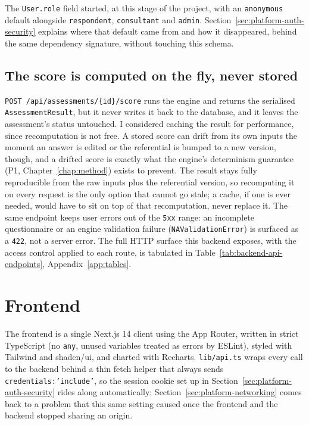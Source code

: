The \texttt{User.\allowbreak role} field started, at this stage of the project, with an \texttt{anonymous} default alongside \texttt{respondent}, \texttt{consultant} and \texttt{admin}. Section~\ref{sec:platform-auth-security} explains where that default came from and how it disappeared, behind the same dependency signature, without touching this schema.

\subsection{The score is computed on the fly, never stored}

\texttt{POST /\allowbreak api/\allowbreak assessments/\allowbreak \{id\}/\allowbreak score} runs the engine and returns the serialised \texttt{Assessment\allowbreak Result}, but it never writes it back to the database, and it leaves the assessment's status untouched. I considered caching the result for performance, since recomputation is not free. A stored score can drift from its own inputs the moment an answer is edited or the referential is bumped to a new version, though, and a drifted score is exactly what the engine's determinism guarantee (P1, Chapter~\ref{chap:method}) exists to prevent. The result stays fully reproducible from the raw inputs plus the referential version, so recomputing it on every request is the only option that cannot go stale; a cache, if one is ever needed, would have to sit on top of that recomputation, never replace it. The same endpoint keeps user errors out of the \texttt{5xx} range: an incomplete questionnaire or an engine validation failure (\texttt{NAValidation\allowbreak Error}) is surfaced as a \texttt{422}, not a server error. The full HTTP surface this backend exposes, with the access control applied to each route, is tabulated in Table~\ref{tab:backend-api-endpoints}, Appendix~\ref{app:tables}.

\section{Frontend}
\label{sec:platform-frontend}

The frontend is a single Next.js 14 client using the App Router, written in strict TypeScript (no \texttt{any}, unused variables treated as errors by ESLint), styled with Tailwind and shadcn/ui, and charted with Recharts. \texttt{lib/\allowbreak api.\allowbreak ts} wraps every call to the backend behind a thin fetch helper that always sends \texttt{credentials:\allowbreak 'include'}, so the session cookie set up in Section~\ref{sec:platform-auth-security} rides along automatically; Section~\ref{sec:platform-networking} comes back to a problem that this same setting caused once the frontend and the backend stopped sharing an origin.

